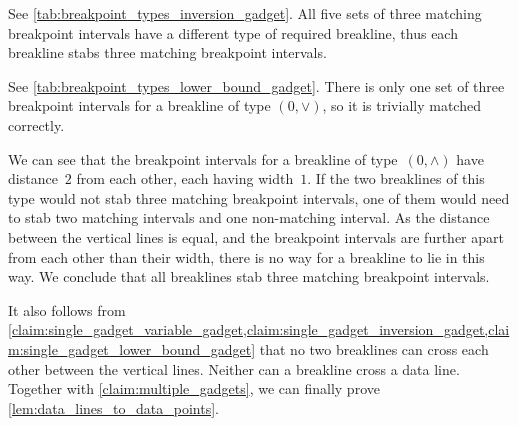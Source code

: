 \documentclass{toc}
\begin{document}
\begin{claimproof}
    See \cref{tab:breakpoint_types_inversion_gadget}.
    All five sets of three matching breakpoint intervals have a different type of required breakline, thus each breakline stabs three matching breakpoint intervals.
\end{claimproof}


\begin{claimproof}
    See \cref{tab:breakpoint_types_lower_bound_gadget}.
    There is only one set of three breakpoint intervals for a breakline of type $(0,\vee)$, so it is trivially matched correctly.

    We can see that the breakpoint intervals for a breakline of type~$(0,\wedge)$ have distance~$2$ from each other, each having width~$1$.
    If the two breaklines of this type would not stab three matching breakpoint intervals, one of them would need to stab two matching intervals and one non-matching interval.
    As the distance between the vertical lines is equal, and the breakpoint intervals are further apart from each other than their width, there is no way for a breakline to lie in this way.
    We conclude that all breaklines stab three matching breakpoint intervals.
\end{claimproof}

It also follows from \cref{claim:single_gadget_variable_gadget,claim:single_gadget_inversion_gadget,claim:single_gadget_lower_bound_gadget} that no two breaklines can cross each other between the vertical lines.
Neither can a breakline cross a data line.
Together with \cref{claim:multiple_gadgets}, we can finally prove \cref{lem:data_lines_to_data_points}.
\end{document}
